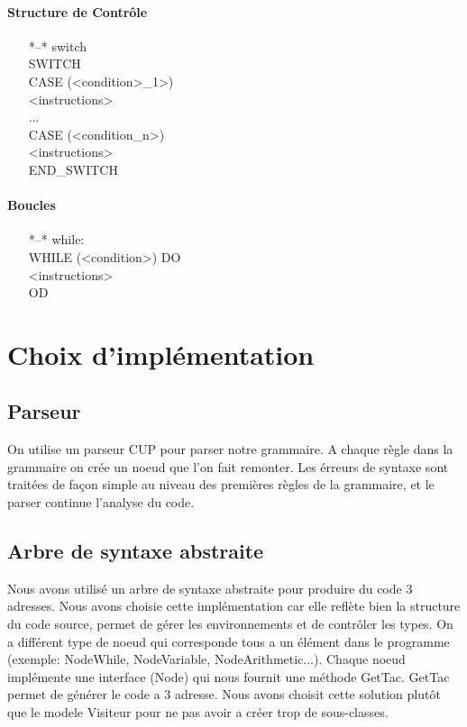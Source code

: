 \documentclass[10pt,a4paper]{report}
\begin{document}
\paragraph{Structure de Contrôle}
\begin{itemize}
\item[*--*]switch\:
	\\SWITCH
	\\ CASE (<condition>\_1>)
	\\	<instructions>
	\\...
	\\CASE (<condition\_n>)
	\\	<instructions>
	\\END\_SWITCH
\end{itemize}

\paragraph{Boucles}
\begin{itemize}

\item[*--*]while:
	\\WHILE (<condition>) DO
		\\<instructions>
	\\OD

\end{itemize}

\section{Choix d'implémentation}


\subsection{Parseur}
On utilise un parseur CUP pour parser notre grammaire.
A chaque règle dans la grammaire on crée un noeud que l'on fait remonter.
Les érreurs de syntaxe sont traitées de façon simple au niveau des premières règles de la grammaire, 
et le parser continue l'analyse du code.

\subsection{Arbre de syntaxe abstraite}

Nous avons utilisé un arbre de syntaxe abstraite pour produire du code 3 adresses.
Nous avons choisie cette implémentation car elle reflète bien la structure du code source, permet de gérer les environnements et de contrôler les types.
On a différent type de noeud qui corresponde tous a un élément dans le programme (exemple: NodeWhile, NodeVariable, NodeArithmetic...).
Chaque noeud implémente une interface (Node) qui nous fournit une méthode GetTac.
GetTac permet de générer le code a 3 adresse.
Nous avons choisit cette solution plutôt que le modele Visiteur pour ne pas avoir a créer trop de sous-classes.
\end{document}
